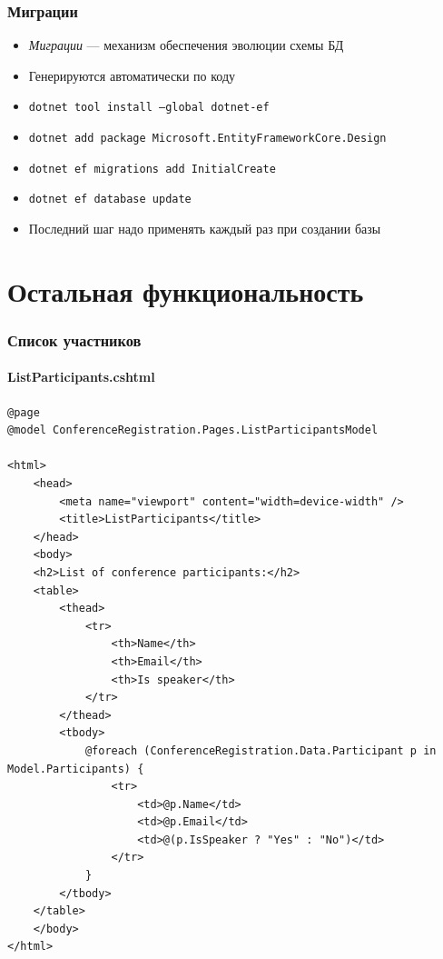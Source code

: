\documentclass{../../slides-style}
\begin{document}
    \begin{frame}[fragile]
        \frametitle{Миграции}
        \begin{itemize}
            \item \emph{Миграции} --- механизм обеспечения эволюции схемы БД
            \item Генерируются автоматически по коду
            \item \texttt{dotnet tool install --global dotnet-ef}
            \item \texttt{dotnet add package Microsoft.EntityFrameworkCore.Design}
            \item \texttt{dotnet ef migrations add InitialCreate}
            \item \texttt{dotnet ef database update}
            \item Последний шаг надо применять каждый раз при создании базы
        \end{itemize}
    \end{frame}

    \section{Остальная функциональность}

    \begin{frame}[fragile]
        \frametitle{Список участников}
        \framesubtitle{ListParticipants.cshtml}
        \begin{ssmall}
            \begin{verbatim}
@page
@model ConferenceRegistration.Pages.ListParticipantsModel

<html>
    <head>
        <meta name="viewport" content="width=device-width" />
        <title>ListParticipants</title>
    </head>
    <body>
    <h2>List of conference participants:</h2>
    <table>
        <thead>
            <tr>
                <th>Name</th>
                <th>Email</th>
                <th>Is speaker</th>
            </tr>
        </thead>
        <tbody>
            @foreach (ConferenceRegistration.Data.Participant p in Model.Participants) {
                <tr>
                    <td>@p.Name</td>
                    <td>@p.Email</td>
                    <td>@(p.IsSpeaker ? "Yes" : "No")</td>
                </tr>
            }
        </tbody>
    </table>
    </body>
</html>
            \end{verbatim}
        \end{ssmall}
    \end{frame}
\end{document}
